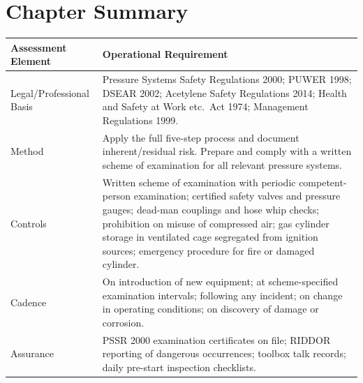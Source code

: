 
\newpage
\section{Chapter Summary}

\begin{table}[H]
\centering
\begin{tabularx}{\textwidth}{>{\raggedright\arraybackslash}p{3.2cm}X}
\toprule
\textbf{Assessment Element} & \textbf{Operational Requirement} \\
\midrule
Legal/Professional Basis & Pressure Systems Safety Regulations 2000; PUWER 1998; DSEAR 2002; Acetylene Safety Regulations 2014; Health and Safety at Work etc.\ Act 1974; Management Regulations 1999. \\
Method & Apply the full five-step process and document inherent/residual risk. Prepare and comply with a written scheme of examination for all relevant pressure systems. \\
Controls & Written scheme of examination with periodic competent-person examination; certified safety valves and pressure gauges; dead-man couplings and hose whip checks; prohibition on misuse of compressed air; gas cylinder storage in ventilated cage segregated from ignition sources; emergency procedure for fire or damaged cylinder. \\
Cadence & On introduction of new equipment; at scheme-specified examination intervals; following any incident; on change in operating conditions; on discovery of damage or corrosion. \\
Assurance & PSSR 2000 examination certificates on file; RIDDOR reporting of dangerous occurrences; toolbox talk records; daily pre-start inspection checklists. \\
\bottomrule
\end{tabularx}
\end{table}

